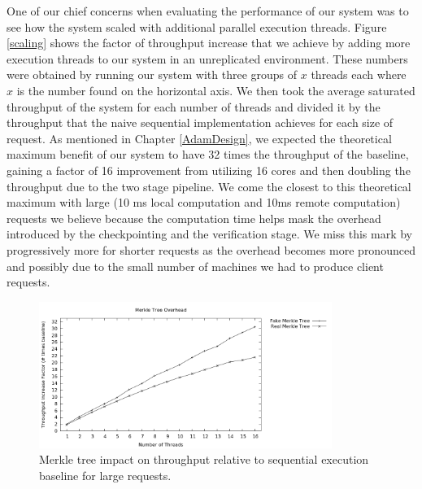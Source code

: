 \documentclass[11pt, oneside]{report}
\begin{document}
One of our chief concerns when evaluating the performance of our system was to see how the system scaled with additional parallel execution threads. Figure \ref{scaling} shows the factor of throughput increase that we achieve by adding more execution threads to our system in an unreplicated environment. 
These numbers were obtained by running our system with three groups of $x$ threads each where $x$ is the number found on the horizontal axis. 
We then took the average saturated throughput of the system for each number of threads and divided it by the throughput that the naive sequential implementation achieves for each size of request.
As mentioned in Chapter \ref{AdamDesign}, we expected the theoretical maximum benefit of our system to have 32 times the throughput of the baseline, gaining a factor of 16 improvement from utilizing 16 cores and then doubling the throughput due to the two stage pipeline.
We come the closest to this theoretical maximum with large (10 ms local computation and 10ms remote computation) requests  we believe because the computation time helps mask the overhead introduced by the checkpointing and the verification stage.
We miss this mark by progressively more for shorter requests as the overhead becomes more pronounced and possibly due to the small number of machines we had to produce client requests.

\begin{figure}[h]
\centering
\includegraphics[width=0.85\textwidth]{graphs/merkleimpact/graph.png}
\caption{\label{scalingmedmerkletree}Merkle tree impact on throughput relative to sequential execution baseline for large requests.}
\end{figure}
\end{document}
